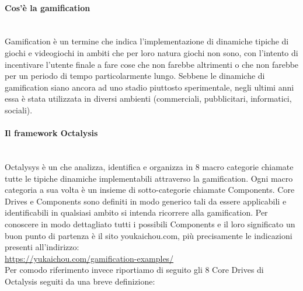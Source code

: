 \paragraph{Cos'è la gamification}
~\\Gamification è un termine che indica l'implementazione di dinamiche tipiche di giochi e videogiochi in ambiti che per loro natura giochi non sono, con l'intento di incentivare l'utente finale a fare cose che non farebbe altrimenti o che non farebbe per un periodo di tempo particolarmente lungo.
Sebbene le dinamiche di gamification siano ancora ad uno stadio piuttosto sperimentale, negli ultimi anni essa è stata utilizzata in diversi ambienti (commerciali, pubblicitari, informatici, sociali).

\paragraph{Il framework Octalysis}
~\\Octalysys è un  che analizza, identifica e organizza in 8 macro categorie chiamate  tutte le tipiche dinamiche implementabili attraverso la gamification. Ogni macro categoria a sua volta è un insieme di sotto-categorie chiamate Components.
Core Drives e Components sono definiti in modo generico tali da essere applicabili e identificabili in qualsiasi ambito si intenda ricorrere alla gamification.
Per conoscere in modo dettagliato tutti i possibili Components e il loro significato un buon punto di partenza è il sito youkaichou.com, più precisamente le indicazioni presenti all'indirizzo: \\
\url{https://yukaichou.com/gamification-examples/} \\
Per comodo riferimento invece riportiamo di seguito gli 8 Core Drives di Octalysis seguiti da una breve definizione:

